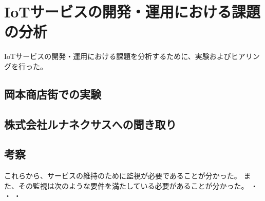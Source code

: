 \section{IoTサービスの開発・運用における課題の分析}
IoTサービスの開発・運用における課題を分析するために、実験およびヒアリングを行った。
\subsection{岡本商店街での実験}


\subsection{株式会社ルナネクサスへの聞き取り}

\subsection{考察}
これらから、サービスの維持のために監視が必要であることが分かった。
また、その監視は次のような要件を満たしている必要があることが分かった。
・
・
・

